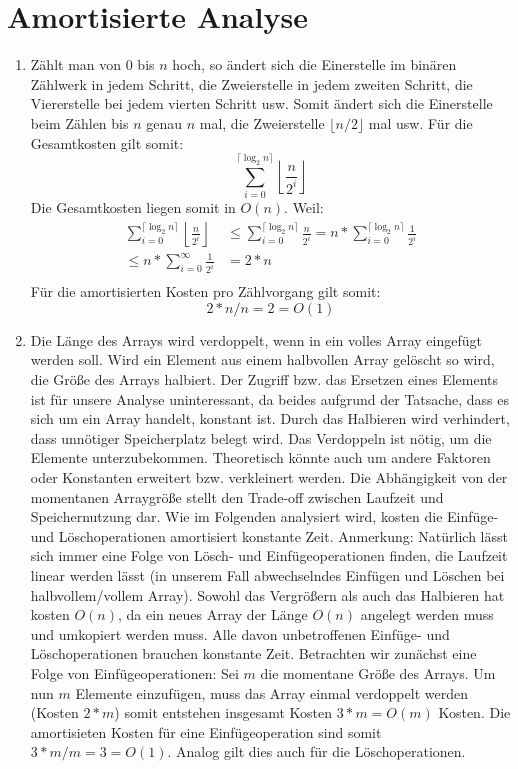 \documentclass[a4paper,10pt]{article}
\begin{document}
\section{Amortisierte Analyse}
\begin{enumerate}
 \item
Zählt man von $0$ bis $n$ hoch, so ändert sich die Einerstelle im binären Zählwerk in jedem Schritt, die Zweierstelle in jedem zweiten Schritt, die Viererstelle bei jedem vierten Schritt usw.
Somit ändert sich die Einerstelle beim Zählen bis $n$ genau $n$ mal, die Zweierstelle $\lfloor{n/2}\rfloor$ mal usw.
Für die Gesamtkosten gilt somit:
\[ \sum_{i = 0}^{\lceil\log_2 n\rceil} \left\lfloor\frac{n}{2^i}\right\rfloor\]
Die Gesamtkosten liegen somit in $O(n)$. Weil:
\begin{align*}
 \sum_{i = 0}^{\lceil\log_2 n\rceil} \left\lfloor\frac{n}{2^i}\right\rfloor &\leq \sum_{i = 0}^{\lceil\log_2 n\rceil} \frac{n}{2^i} =  n * \sum_{i = 0}^{\lceil\log_2 n\rceil} \frac{1}{2^i} \\
 \leq  n * \sum_{i = 0}^{\infty} \frac{1}{2^i} &= 2 * n \\
\end{align*}
Für die amortisierten Kosten pro Zählvorgang gilt somit: 
\[ 2 * n / n = 2 = O(1) \]

\item
Die Länge des Arrays wird verdoppelt, wenn in ein volles Array eingefügt werden soll. Wird ein Element aus einem halbvollen Array gelöscht so wird, die Größe des Arrays halbiert.
Der Zugriff bzw. das Ersetzen eines Elements ist für unsere Analyse uninteressant, da beides aufgrund der Tatsache, dass es sich um ein Array handelt, konstant ist. Durch das Halbieren wird verhindert, dass unnötiger Speicherplatz belegt wird.
Das Verdoppeln ist nötig, um die Elemente unterzubekommen. Theoretisch könnte auch um andere Faktoren oder Konstanten erweitert bzw. verkleinert werden. Die Abhängigkeit von der momentanen Arraygröße stellt den Trade-off zwischen Laufzeit und Speichernutzung dar.
Wie im Folgenden analysiert wird, kosten die Einfüge- und Löschoperationen amortisiert konstante Zeit. Anmerkung: Natürlich lässt sich immer eine Folge von Lösch- und Einfügeoperationen finden, die Laufzeit linear werden lässt (in unserem Fall abwechselndes Einfügen
und Löschen bei halbvollem/vollem Array).
Sowohl das Vergrößern als auch das Halbieren hat kosten $O(n)$, da ein neues Array der Länge $O(n)$ angelegt werden muss und umkopiert werden muss. Alle davon unbetroffenen Einfüge- und Löschoperationen brauchen konstante Zeit.
Betrachten wir zunächst eine Folge von Einfügeoperationen: Sei $m$ die momentane Größe des Arrays. Um nun $m$ Elemente einzufügen, muss das Array einmal verdoppelt werden (Kosten $2*m$) somit entstehen insgesamt Kosten $3*m = O(m)$ Kosten.
Die amortisieten Kosten für eine Einfügeoperation sind somit $3*m / m = 3 = O(1)$. Analog gilt dies auch für die Löschoperationen.


\end{enumerate}
\end{document}
